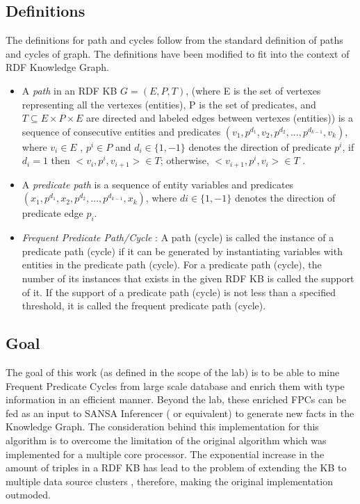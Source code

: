 \documentclass{easychair}
\begin{document}
\subsection{Definitions}
The definitions for path and cycles follow from the standard definition of paths and cycles of graph. The definitions have been modified to fit into the context of RDF Knowledge Graph.
\begin{itemize}
\item A \emph{path} in an RDF KB $G = (E,P,T)$, (where E is the set of vertexes representing all the vertexes (entities), P is the set of predicates, and $T \subseteq {E\times P \times E}$ are directed and labeled edges between vertexes (entities)) is a sequence of consecutive entities and predicates $(v_1 , p^{d_1} , v_2 , p^{d_2} ,...,p^{d_{k-1}},v_k)$, where $v_i \in E$ , $ p^i \in P$ and  $ d_i \in \{1, - 1\}$ denotes the direction of predicate $p^i$, if $d_i = 1$ then $<v_i, p^i, v_{i+1}> \in T$; otherwise, $<v_{i+1}, p^i, v_i> \in T$ .
\item A \emph{predicate path} is a sequence of entity variables and predicates $(x_1 , p^{d_1} , x_2 , p^{d_2} ,...,p^{d_{k-1}},x_k)$, where $di \in \{1, - 1\}$ denotes the direction of predicate edge $p_i$.
\item \emph{Frequent Predicate Path/Cycle }: A path (cycle) is called the instance of a predicate path (cycle) if it can be generated by instantiating variables with entities in the predicate path (cycle). For a predicate path (cycle), the number of its instances that exists in the given RDF KB is called the support of it. If the support of a predicate path (cycle) is not less than a specified threshold, it is called the frequent predicate path (cycle).

\end{itemize}


\subsection{Goal}
The goal of this work (as defined in the scope of the lab) is to be able to mine Frequent Predicate Cycles from large scale database and enrich them with type information in an efficient manner.  Beyond the lab, these enriched FPCs  can be fed as an input to SANSA Inferencer \cite{sansa} ( or equivalent) to generate new facts in the Knowledge Graph.
The consideration behind this implementation for this algorithm is to overcome the limitation of the original algorithm which was implemented for a multiple core processor. The exponential increase in the amount of triples in a RDF KB  has lead to the problem of extending the KB to multiple data source clusters , therefore, making the original implementation outmoded.
\end{document}

